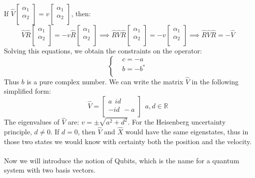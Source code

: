 \documentclass{article}
\begin{document}
If $\hat{V} \begin{bmatrix}
    \alpha_1 \\
    \alpha_2 \\
\end{bmatrix} = v \begin{bmatrix}
    \alpha_1 \\
    \alpha_2 \\
\end{bmatrix}$, then:
$$\hat{V} \hat{R} \begin{bmatrix}
    \alpha_1 \\
    \alpha_2 \\
\end{bmatrix} = -v \hat{R}\begin{bmatrix}
    \alpha_1 \\
    \alpha_2 \\
\end{bmatrix} \implies \hat{R}\hat{V}\hat{R}\begin{bmatrix}
    \alpha_1 \\
    \alpha_2 \\
\end{bmatrix} = -v \begin{bmatrix}
    \alpha_1 \\
    \alpha_2 \\
\end{bmatrix} \implies \hat{R}\hat{V}\hat{R} = - \hat{V}$$
Solving this equations, we obtain the constraints on the operator:
$$\begin{cases}
     &  c=-a \\
     & b =-b^*\\ 
\end{cases} $$
Thus $b$ is a pure complex number. We can write the matrix $\hat{V}$ in the following simplified form: \ \ 
$$\hat{V} = \begin{bmatrix}
    a \ \ id  \\
    -id \ \ -a \\
\end{bmatrix}  \ \ a,d \in \mathbb{R}$$
The eigenvalues of $\hat{V}$ are: $v= \pm \sqrt{a^2+d^2}$.
For the Heisenberg uncertainty principle, $d \neq 0$. If $d = 0$, then $\hat{V}$ and $\hat{X}$ would have the same eigenstates, thus in those two states we would know with certainty both the position and the velocity.\\ \\ 
Now we will introduce the notion of Qubits, which is the name for a quantum system with two basis vectors. \\ 
\end{document}
